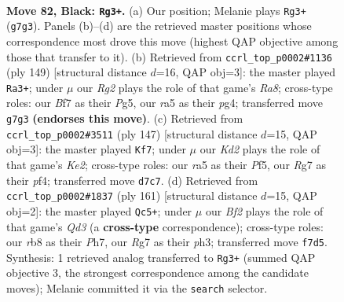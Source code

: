 \documentclass[11pt]{article}
\begin{document}
\clearpage

\begin{figure}[p]\centering
\begin{subfigure}{0.46\textwidth}\centering
\resizebox{\linewidth}{!}{%
\newchessgame
\chessboard[
  setfen={1R6/3k1br1/8/R7/1P6/2K5/8/8 b - - 38 82},
  showmover=false,
  pgfstyle=straightmove, color=movearrow, markmove={g7-g3}
]}
\caption{}
\end{subfigure}\hfill
\begin{subfigure}{0.46\textwidth}\centering
\resizebox{\linewidth}{!}{%
\newchessgame
\chessboard[
  setfen={8/7k/5R2/6p1/6P1/4KP2/8/r7 b - - 50 75},
  showmover=false,
  pgfstyle=straightmove, color=movearrow, markmove={a1-a3}
]}
\caption{}
\end{subfigure}
\\[4pt]
\begin{subfigure}{0.46\textwidth}\centering
\resizebox{\linewidth}{!}{%
\newchessgame
\chessboard[
  setfen={8/4k3/8/5p2/5P2/3R2P1/6K1/r7 b - - 26 74},
  showmover=false,
  pgfstyle=straightmove, color=movearrow, markmove={e7-f7}
]}
\caption{}
\end{subfigure}\hfill
\begin{subfigure}{0.46\textwidth}\centering
\resizebox{\linewidth}{!}{%
\newchessgame
\chessboard[
  setfen={8/7p/3q4/8/8/5R1P/2k3P1/6K1 b - - 22 81},
  showmover=false,
  pgfstyle=straightmove, color=movearrow, markmove={d6-c5}
]}
\caption{}
\end{subfigure}
\caption{\textbf{Move 82, Black: \texttt{Rg3+}.} (a) Our position; Melanie plays \texttt{Rg3+} (\texttt{g7g3}). Panels (b)--(d) are the retrieved master positions whose correspondence most drove this move (highest QAP objective among those that transfer to it). (b) Retrieved from \texttt{ccrl\_top\_p0002\#1136} (ply 149) [structural distance $d$=16, QAP obj=3]: the master played \texttt{Ra3+}; under $\mu$ our \emph{Rg2} plays the role of that game's \emph{Ra8}; cross-type roles: our \emph{B}f7 as their \emph{P}g5, our \emph{r}a5 as their \emph{p}g4; transferred move \texttt{g7g3} \textbf{(endorses this move)}. (c) Retrieved from \texttt{ccrl\_top\_p0002\#3511} (ply 147) [structural distance $d$=15, QAP obj=3]: the master played \texttt{Kf7}; under $\mu$ our \emph{Kd2} plays the role of that game's \emph{Ke2}; cross-type roles: our \emph{r}a5 as their \emph{P}f5, our \emph{R}g7 as their \emph{p}f4; transferred move \texttt{d7c7}. (d) Retrieved from \texttt{ccrl\_top\_p0002\#1837} (ply 161) [structural distance $d$=15, QAP obj=2]: the master played \texttt{Qc5+}; under $\mu$ our \emph{Bf2} plays the role of that game's \emph{Qd3} (a \textbf{cross-type} correspondence); cross-type roles: our \emph{r}b8 as their \emph{P}h7, our \emph{R}g7 as their \emph{p}h3; transferred move \texttt{f7d5}. Synthesis: 1 retrieved analog transferred to \texttt{Rg3+} (summed QAP objective 3, the strongest correspondence among the candidate moves); Melanie committed it via the \texttt{search} selector.}
\label{fig:thought-m163}
\end{figure}
\end{document}
